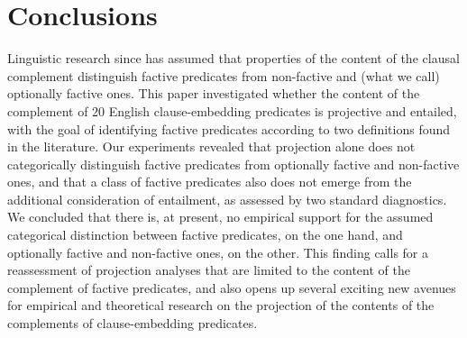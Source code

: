 \documentclass[11pt,fleqn]{article}
\newcommand{\6}{\mbox{$[\hspace*{-.6mm}[$}}
\newcommand{\9}{\mbox{$]\hspace*{-.6mm}]$}}
\begin{document}
{\section{Conclusions}\label{s5}

Linguistic research since \citealt{kiparsky-kiparsky70} has assumed that properties of the content of the clausal complement distinguish factive predicates from non-factive and (what we call) optionally factive ones. This paper investigated whether the content of the complement of 20 English clause-embedding predicates is projective and entailed, with the goal of identifying factive predicates according to two definitions found in the literature. Our experiments revealed that projection alone does not categorically distinguish factive predicates from optionally factive and non-factive ones, and that a class of factive predicates also does not emerge from the additional consideration of entailment, as assessed by two standard diagnostics. We concluded that there is, at present, no empirical support for the assumed categorical distinction between factive predicates, on the one hand, and optionally factive and non-factive ones, on the other. This finding calls for a reassessment of projection analyses that are limited to the content of the complement of factive predicates, and also opens up several exciting new avenues for empirical and theoretical research on the projection of the contents of the complements of clause-embedding predicates.




\appendix

\setcounter{table}{0}
\renewcommand{\thetable}{A\arabic{table}}

\setcounter{figure}{0}
\renewcommand{\thefigure}{A\arabic{figure}}

}
\end{document}
